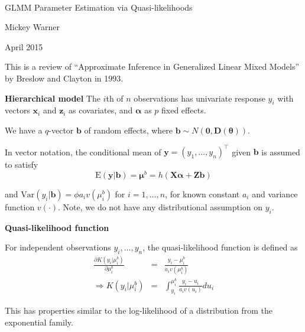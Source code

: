 \documentclass[mathserif, 10pt, t]{beamer}
\newcommand{\E}{\mathrm{E}}
\newcommand{\Var}{\mathrm{Var}}
\newcommand{\m}[1]{\mathbf{\bm{#1}}}
\renewcommand{\subtitle}[1]{\vspace{0.45cm}\textcolor{bluegreen}{
    {\textbf{#1}}}\vspace{0.15cm}\newline}
\begin{document}
\begin{center}
\ \\ [-0.5in]
\vfill
\bigskip
\bigskip
\bigskip
\bigskip
\bigskip

\begin{LARGE}
\begin{center}
GLMM Parameter Estimation via Quasi-likelihoods
\end{center}
\end{LARGE}
\vfill

\begin{center}
Mickey Warner
\end{center}
\vfill
April 2015
\bigskip
\bigskip
\bigskip
\vfill
\ \\ [-0.5in]
\end{center}

\begin{frame}
\subtitle{}
This is a review of ``Approximate Inference in Generalized Linear Mixed Models'' by Breslow and Clayton in 1993.

\end{frame}

\begin{frame}
\subtitle{Hierarchical model}
The $i$th of $n$ observations has univariate response $y_i$ with vectors $\m{x}_i$ and $\m{z}_i$ as covariates, and $\m{\alpha}$ as $p$ fixed effects.
\bigskip

We have a $q$-vector $\m{b}$ of random effects, where $\m{b}\sim N(\m{0},\m{D}(\m{\theta}))$.
\bigskip

In vector notation, the conditional mean of $\m{y}=(y_1,\ldots,y_n)^\top$ given $\m{b}$ is assumed to satisfy
\[ \E(\m{y}|\m{b}) = \m{\mu}^b = h(\m{X}\m{\alpha} + \m{Z}\m{b}) \]

and $\Var(y_i|\m{b})=\phi a_iv(\mu_i^b)$ for $i=1,\ldots,n$, for known constant $a_i$ and variance function $v(\cdot)$. Note, we do not have any distributional assumption on $y_i$.

\end{frame}

\begin{frame}
\subtitle{Quasi-likelihood function}

For independent observations $y_i,\ldots,y_n$, the quasi-likelihood function is defined as
\begin{eqnarray*}
\frac{\partial K(y_i| \mu_i^b)}{\partial \mu_i^b} &=& \frac{y_i-\mu_i^b}{a_i v(\mu_i^b)} \\
\Longrightarrow K(y_i|\mu_i^b)&=&\int_{y_i}^{\mu_i^b}\frac{y_i-u_i}{a_i v(u_i)}du_i
\end{eqnarray*}

This has properties similar to the log-likelihood of a distribution from the exponential family.


\end{frame}
\end{document}
